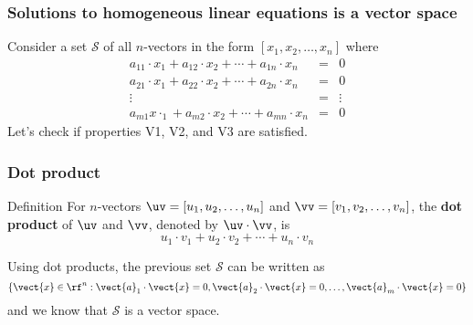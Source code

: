 \begin{frame}
  \frametitle{Solutions to homogeneous linear equations is a vector space}
  Consider a set ${\mathcal S}$ of all $n$-vectors in the form $[x_1,x_2,\ldots,x_n]$ where
  \[
  \begin{array}{rcl}
    a_{11}\cdot x_1 + a_{12}\cdot x_2 + \cdots + a_{1n}\cdot x_n &=& 0 \\
    a_{21}\cdot x_1 + a_{22}\cdot x_2 + \cdots + a_{2n}\cdot x_n &=& 0 \\
    \vdots &=& \vdots \\
    a_{m1}x\cdot _1 + a_{m2}\cdot x_2 + \cdots + a_{mn}\cdot x_n &=& 0
  \end{array}
  \]
  \vspace{0.2in}
  Let's check if properties V1, V2, and V3 are satisfied.
  \vspace{1.5in}
  
\end{frame}

\begin{frame}
  \frametitle{Dot product}

  \begin{block}{Definition}
    For $n$-vectors $\uv=[u_1,u_2,\ldots,u_n]$ and $\vv=[v_1,v_2,\ldots,v_n]$, the {\bf dot product} of $\uv$ and $\vv$, denoted by $\uv\cdot\vv$, is
    \[
    u_1\cdot v_1 + 
    u_2\cdot v_2 +
    \cdots +
    u_n\cdot v_n 
    \]
  \end{block}

  \vspace{0.2in}
  \pause
  Using dot products, the previous set $\mathcal S$ can be written as
  \[
  \{ \vect{x}\in \rf^n :
  \vect{a}_1\cdot \vect{x} = 0,
  \vect{a}_2\cdot \vect{x} = 0,\ldots,
  \vect{a}_m\cdot \vect{x} = 0
  \}
  \]
  and we know that $\mathcal S$ is a vector space.
\end{frame}
